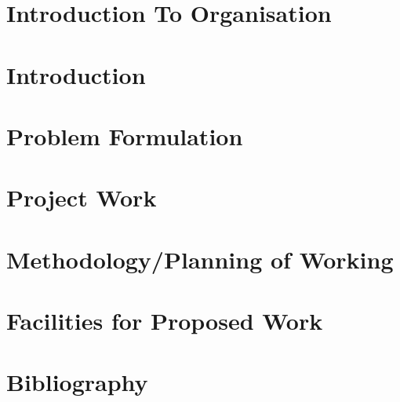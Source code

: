 \documentclass[12pt]{article}
\begin{document}

\begin{screen}
\ppttitle
\end{screen}
\footskip 0.7cm
\thispagestyle{empty} 
\pagetitle
\newpage
{}
\cfoot{\thepage}

%
% 
% 

\newpage
\tableofcontents
\newpage
\listoffigures
\newpage

\cfoot{\thepage}

\newpage
\section{Introduction To Organisation}

\newpage
\section{Introduction}

\newpage
\section{Problem Formulation}

% 
% 
% 
% 
\newpage
\section{Project Work}

\newpage
\section{Methodology/Planning of Working}

\newpage
\section{Facilities for Proposed Work}

% 
\newpage
\section{Bibliography}

\begin{screen}
\newpage

\end{screen}
\end{document}
